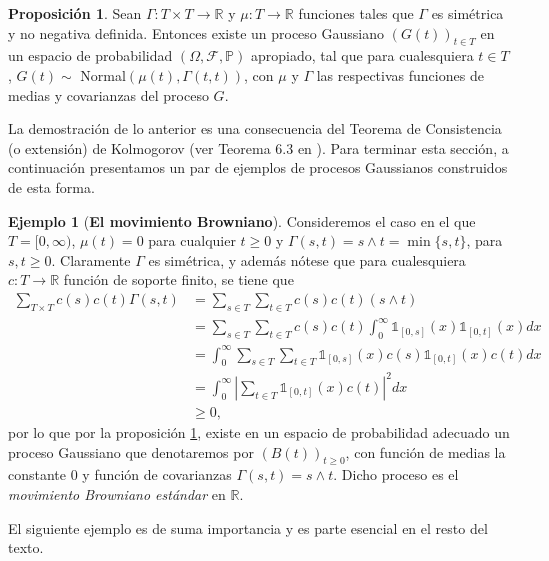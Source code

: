 \documentclass[letterpaper,twoside,12pt]{book}
\newcommand{\R}{\mathbb{R}}
\newcommand{\F}{\mathcal{F}}
\renewcommand{\P}{\mathbb{P}}
\newcommand{\1}{\mathds{1}}
\newcommand{\abs}[1]{\left\lvert #1 \right\rvert}
\renewcommand{\to}{\rightarrow}
\theoremstyle{definition}
\theoremstyle{definition}
\theoremstyle{remark}
\theoremstyle{definition}
\theoremstyle{definition}
\newtheorem{prop}{Proposición}
\theoremstyle{definition}
\theoremstyle{definition}
\newtheorem{ejem}{Ejemplo}
\theoremstyle{definition}
\begin{document}
\begin{prop}\label{caractprocgauss}
 Sean $\Gamma:T\times T\to \R$ y $\mu:T\to \R$ funciones tales que $\Gamma$ es simétrica y no negativa definida. Entonces existe un proceso Gaussiano $(G(t))_{t\in T}$ en un espacio de probabilidad $(\Omega, \F,\P)$ apropiado, tal que para cualesquiera $t\in T$, $G(t)\sim$ Normal$(\mu(t),\Gamma(t,t))$, con $\mu$ y $\Gamma$ las respectivas funciones de medias y covarianzas del proceso $G$.
 \end{prop}
 La demostración de lo anterior es una consecuencia del Teorema de Consistencia (o extensión) de Kolmogorov (ver Teorema 6.3 en \cite{gall2016brownian} ). Para terminar esta sección, a continuación presentamos un par de ejemplos de procesos Gaussianos construidos de esta forma.
\begin{ejem}[\textbf{El movimiento Browniano}]
Consideremos el caso en el que $T=[0,\infty)$, $\mu(t)=0$ para cualquier $t\geq0$ y $\Gamma(s,t)=s\wedge t=\min\{s,t\}$, para $s,t\geq0$. Claramente $\Gamma$ es simétrica, y además nótese que para cualesquiera $c:T\to\R$ función de soporte finito, se tiene que
\begin{align*}
\sum_{T\times T}^{}c(s)c(t)\Gamma(s,t)&=\sum_{s\in T}^{}\sum_{t\in T}c(s)c(t)(s\wedge t)\\
&=\sum_{s\in T}^{}\sum_{t\in T}c(s)c(t)\int_{0}^{\infty}\1_{[0,s]}(x)\1_{[0,t]}(x)dx\\
&=\int_{0}^{\infty}\sum_{s\in T}\sum_{t\in T}\1_{[0,s]}(x)c(s)\1_{[0,t]}(x)c(t)dx\\
&=\int_{0}^{\infty}\abs{\sum_{t\in T}\1_{[0,t]}(x)c(t)}^2dx\\
&\geq0,
\end{align*}
por lo que por la proposición \ref{caractprocgauss}, existe en un espacio de probabilidad adecuado un proceso Gaussiano que denotaremos por $(B(t))_{t\geq0}$, con función de medias la constante 0 y función de covarianzas $\Gamma(s,t)=s\wedge t$. Dicho proceso es el \textit{movimiento Browniano estándar} en $\R$.
 \end{ejem}
El siguiente ejemplo es de suma importancia y es parte esencial en el resto del texto.
\end{document}
